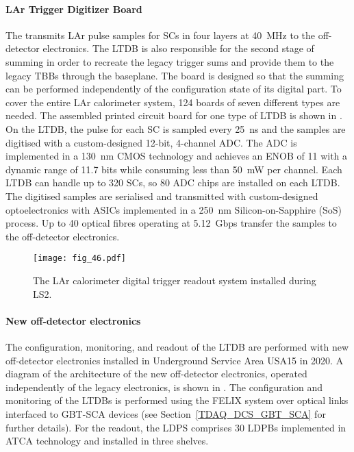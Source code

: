 \documentclass[cernpreprint, atlasdraft=false, UKenglish,british,orcidlogo, texmf, orcidlogo]{atlasdoc}
\begin{document}
 
\paragraph{LAr Trigger Digitizer Board} The  transmits \gls{LAr}
pulse samples for \glspl{SC} in four layers at \SI{40}{MHz} to the off-detector electronics.
The \gls{LTDB} is also responsible for the second stage of
\analog summing in order to recreate the legacy trigger sums and provide them
to the legacy \glspl{TBB} through the baseplane.
The board is designed so that the summing can be performed independently of
the configuration state of its digital part.
To cover the entire \gls{LAr} calorimeter system, 124 boards of seven different
types are needed. 
The assembled printed circuit board
for one type of \gls{LTDB} is shown in \Fig{\ref{fig:larLTDB}}.
On the \gls{LTDB}, the pulse for each \gls{SC} is sampled every \SI{25}{ns} and the
samples are digitised with a custom-designed 12-bit, 4-channel \gls{ADC}. The ADC is
implemented in a \SI{130}{nm} CMOS technology and achieves an \gls{ENOB} of 11 with a dynamic
range of 11.7 bits while consuming less than \SI{50}{\mW} per channel.
Each \gls{LTDB} can handle up to 320 \glspl{SC}, so 80 \gls{ADC} chips are installed on each \gls{LTDB}.
The digitised samples are serialised and transmitted with custom-designed optoelectronics
with \glspl{ASIC} implemented in a \SI{250}{nm} Silicon-on-Sapphire (SoS) process.
Up to 40 optical fibres operating at \SI{5.12}{Gbps} transfer the samples to the off-detector electronics.
 
 
 
\begin{figure}[t]
\begin{center}
\texttt{[image: fig\_46.pdf]}
\end{center}
\caption{The \gls{LAr} calorimeter digital trigger readout system installed during \gls{LS2}.}
\label{fig:lar-phase-I-BE-arch}
\end{figure}
 
 
\paragraph{New off-detector electronics} The configuration, monitoring, and readout of the \gls{LTDB} are performed
with new off-detector electronics installed in 
Underground Service Area
\gls{USA15} in 2020. A diagram of the architecture of the new off-detector electronics,
operated independently of the legacy electronics,
is shown in \Fig{\ref{fig:lar-phase-I-BE-arch}}.
The configuration and monitoring of the \glspl{LTDB}
is performed using the \gls{FELIX} system over optical links
interfaced to \gls{GBT-SCA} devices (see Section~\ref{TDAQ_DCS_GBT_SCA} for further details).
For the readout, the \gls{LDPS} comprises
\num{30} \glspl{LDPB} implemented in \gls{ATCA} technology and installed in three shelves.
 
\end{document}
